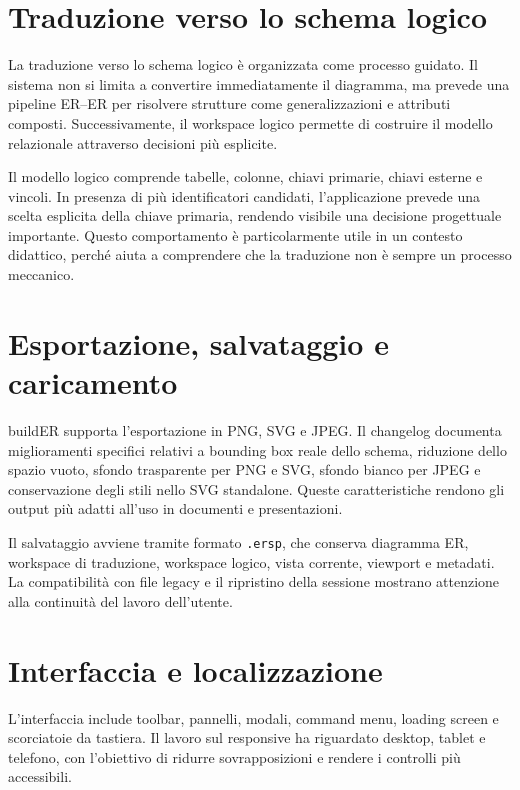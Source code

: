 \documentclass{unipd-thesis-modern}
\newcommand{\builder}{buildER}
\begin{document}
\section{Traduzione verso lo schema logico}

La traduzione verso lo schema logico è organizzata come processo guidato. Il sistema non si limita a convertire immediatamente il diagramma, ma prevede una pipeline ER--ER per risolvere strutture come generalizzazioni e attributi composti. Successivamente, il workspace logico permette di costruire il modello relazionale attraverso decisioni più esplicite.

Il modello logico comprende tabelle, colonne, chiavi primarie, chiavi esterne e vincoli. In presenza di più identificatori candidati, l'applicazione prevede una scelta esplicita della chiave primaria, rendendo visibile una decisione progettuale importante. Questo comportamento è particolarmente utile in un contesto didattico, perché aiuta a comprendere che la traduzione non è sempre un processo meccanico.

\section{Esportazione, salvataggio e caricamento}

\builder{} supporta l'esportazione in PNG, SVG e JPEG. Il changelog documenta miglioramenti specifici relativi a bounding box reale dello schema, riduzione dello spazio vuoto, sfondo trasparente per PNG e SVG, sfondo bianco per JPEG e conservazione degli stili nello SVG standalone. Queste caratteristiche rendono gli output più adatti all'uso in documenti e presentazioni.

Il salvataggio avviene tramite formato \texttt{.ersp}, che conserva diagramma ER, workspace di traduzione, workspace logico, vista corrente, viewport e metadati. La compatibilità con file legacy e il ripristino della sessione mostrano attenzione alla continuità del lavoro dell'utente.

\section{Interfaccia e localizzazione}

L'interfaccia include toolbar, pannelli, modali, command menu, loading screen e scorciatoie da tastiera. Il lavoro sul responsive ha riguardato desktop, tablet e telefono, con l'obiettivo di ridurre sovrapposizioni e rendere i controlli più accessibili.
\end{document}
